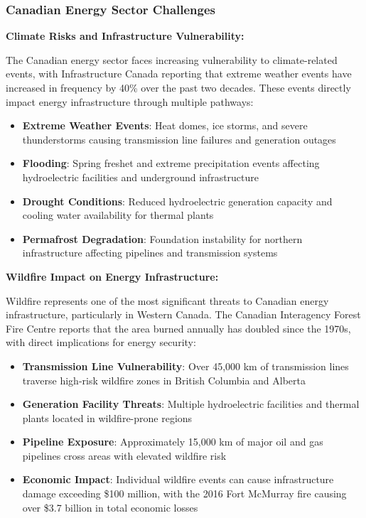 \subsubsection{Canadian Energy Sector Challenges}

\textbf{Climate Risks and Infrastructure Vulnerability:}

The Canadian energy sector faces increasing vulnerability to climate-related events, with Infrastructure Canada reporting that extreme weather events have increased in frequency by 40\% over the past two decades. These events directly impact energy infrastructure through multiple pathways:

\begin{itemize}
    \item \textbf{Extreme Weather Events}: Heat domes, ice storms, and severe thunderstorms causing transmission line failures and generation outages
    \item \textbf{Flooding}: Spring freshet and extreme precipitation events affecting hydroelectric facilities and underground infrastructure
    \item \textbf{Drought Conditions}: Reduced hydroelectric generation capacity and cooling water availability for thermal plants
    \item \textbf{Permafrost Degradation}: Foundation instability for northern infrastructure affecting pipelines and transmission systems
\end{itemize}

\textbf{Wildfire Impact on Energy Infrastructure:}

Wildfire represents one of the most significant threats to Canadian energy infrastructure, particularly in Western Canada. The Canadian Interagency Forest Fire Centre reports that the area burned annually has doubled since the 1970s, with direct implications for energy security:

\begin{itemize}
    \item \textbf{Transmission Line Vulnerability}: Over 45,000 km of transmission lines traverse high-risk wildfire zones in British Columbia and Alberta
    \item \textbf{Generation Facility Threats}: Multiple hydroelectric facilities and thermal plants located in wildfire-prone regions
    \item \textbf{Pipeline Exposure}: Approximately 15,000 km of major oil and gas pipelines cross areas with elevated wildfire risk
    \item \textbf{Economic Impact}: Individual wildfire events can cause infrastructure damage exceeding \$100 million, with the 2016 Fort McMurray fire causing over \$3.7 billion in total economic losses
\end{itemize}

